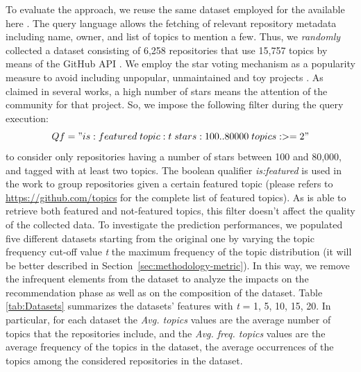 To evaluate the approach, we reuse the same dataset employed for the \MNB available here \cite{MNBreplication}. The \GH query language \cite{understanding} allows the fetching of relevant repository metadata including name, owner, and list of topics to mention a few. Thus, we \emph{randomly} collected a dataset consisting of 6,258 repositories that use 15,757 topics by means of the GitHub API \cite{pygithub/pygithub_2019}. We employ the \GH star voting mechanism as a popularity measure to avoid including unpopular, unmaintained and toy projects \cite{borges_whats_2018}. As claimed in several works\cite{borges_popularity_2017, borges_predicting_2016}, a high number of stars means the attention of the community for that project. So, we impose the following filter during the query execution:
\begin{equation}
\small
Qf = "is:featured \; topic:t \; stars:100..80000 \; topics:>=2"
\end{equation}%
to consider only \GH repositories having a number of stars between 100 and 80,000, and tagged with at least two topics. The boolean qualifier \emph{is:featured} is used in the \MNB work to group repositories given a certain featured topic (please refers to \url{https://github.com/topics} for the complete list of featured topics). As \CT is able to retrieve both featured and not-featured topics, this filter doesn't affect the quality of the collected data.
To investigate the \CT prediction performances, we populated five different datasets starting from the original one by varying the topic frequency cut-off value \emph{t} \ie the maximum frequency of the topic distribution (it will be better described in Section~\ref{sec:methodology-metric}). In this way, we remove the infrequent elements from the dataset to analyze the impacts on the recommendation phase as well as on the composition of the dataset. Table \ref{tab:Datasets} summarizes the datasets' features with \emph{t} = 1, 5, 10, 15, 20. In particular, for each dataset the \emph{Avg. topics} values are the average number of topics that the repositories include, and the  \emph{Avg. freq. topics} values are the average frequency of the topics in the dataset, \ie the average occurrences of the topics among  the considered repositories in the dataset.


